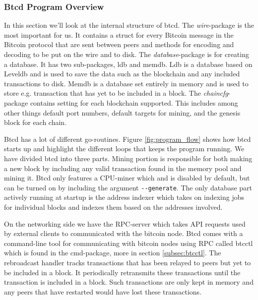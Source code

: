 \documentclass[12pt]{article}
\begin{document}
\subsubsection{Btcd Program Overview}
In this section we'll look at the internal structure of btcd. The \emph{wire}-package is the most important for us. It contains a struct for every Bitcoin message in the Bitcoin protocol that are sent between peers and methods for encoding and decoding to be put on the wire and to disk. The \emph{database}-package is for creating a database. It has two sub-packages, ldb and memdb. Ldb is a database based on Leveldb and is used to save the data such as the blockchain and any included transactions to disk. Memdb is a database set entirely in memory and is used to store e.g. transaction that has yet to be included in a block. The \emph{chaincfg}-package contains setting for each blockchain supported. This includes among other things default port numbers, default targets for mining, and the genesis block for each chain.


Btcd has a lot of different go-routines. Figure \ref{fig:program_flow} shows how btcd starts up and highlight the different loops that keeps the program running. We have divided btcd into three parts. Mining portion is responsible for both making a new block by including any valid transaction found in the memory pool and mining it. Btcd only features a CPU-miner which and is disabled by default, but can be turned on by including the argument \texttt{-{}-generate}. The only database part actively running at startup is the address indexer which takes on indexing jobs for individual blocks and indexes them based on the addresses involved.

On the networking side we have the RPC-server which takes API requests used by external clients to communicated with the bitcoin node. Btcd comes with a command-line tool for communicating with bitcoin nodes using RPC called btcctl which is found in the cmd-package, more in section \ref{subsec:btcctl}. The rebroadcast handler tracks transactions that has been relayed to peers but yet to be included in a block. It periodically retransmits these transactions until the transaction is included in a block. Such transactions are only kept in memory and any peers that have restarted would have lost these transactions.
\end{document}
